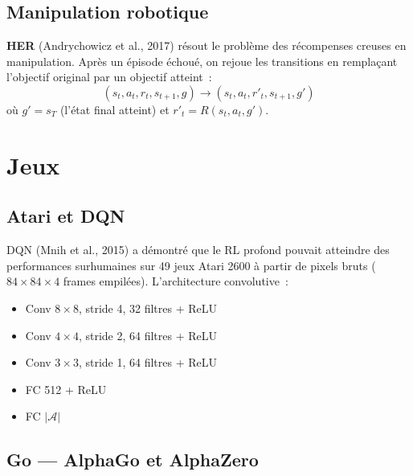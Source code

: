 \subsection{Manipulation robotique}

\begin{definition}
\textbf{HER} (Andrychowicz et al., 2017) r\'esout le probl\`eme des r\'ecompenses
creuses en manipulation. Apr\`es un \'episode \'echou\'e, on rejoue les transitions
en rempla\c{c}ant l'objectif original par un objectif atteint~:
\[
    (s_t, a_t, r_t, s_{t+1}, g) \to (s_t, a_t, r'_t, s_{t+1}, g')
\]
o\`u $g' = s_T$ (l'\'etat final atteint) et $r'_t = R(s_t, a_t, g')$.
\end{definition}

\section{Jeux}

\subsection{Atari et DQN}

\begin{remarque}
DQN (Mnih et al., 2015) a d\'emontr\'e que le RL profond pouvait atteindre des
performances surhumaines sur 49 jeux Atari 2600 \`a partir de pixels bruts
($84 \times 84 \times 4$ frames empil\'ees). L'architecture convolutive~:
\begin{itemize}
    \item Conv $8 \times 8$, stride 4, 32 filtres + ReLU
    \item Conv $4 \times 4$, stride 2, 64 filtres + ReLU
    \item Conv $3 \times 3$, stride 1, 64 filtres + ReLU
    \item FC 512 + ReLU
    \item FC $|\mathcal{A}|$
\end{itemize}
\end{remarque}

\subsection{Go --- AlphaGo et AlphaZero}

